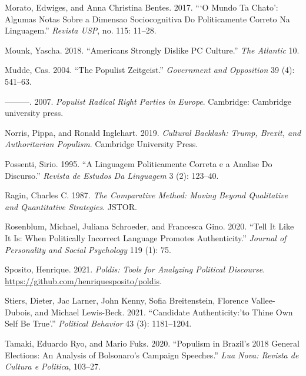 \documentclass[
  12pt,
]{article}
\newlength{\cslhangindent}
\newlength{\cslentryspacingunit} %
\newenvironment{CSLReferences}[2] %
 {%
  \setlength{\parindent}{0pt}
  \ifodd #1
  \let\oldpar\par
  \def\par{\hangindent=\cslhangindent\oldpar}
  \fi
  \setlength{\parskip}{#2\cslentryspacingunit}
 }%
 {}
\begin{document}
\begin{CSLReferences}{1}{0}
\leavevmode{}%
Morato, Edwiges, and Anna Christina Bentes. 2017. {``{`O Mundo Ta
Chato'}: Algumas Notas Sobre a Dimensao Sociocognitiva Do Politicamente
Correto Na Linguagem.''} \emph{Revista USP}, no. 115: 11--28.

\leavevmode{}%
Mounk, Yascha. 2018. {``Americans Strongly Dislike PC Culture.''}
\emph{The Atlantic} 10.

\leavevmode{}%
Mudde, Cas. 2004. {``The Populist Zeitgeist.''} \emph{Government and
Opposition} 39 (4): 541--63.

\leavevmode{}%
---------. 2007. \emph{Populist Radical Right Parties in Europe}.
Cambridge: Cambridge university press.

\leavevmode{}%
Norris, Pippa, and Ronald Inglehart. 2019. \emph{Cultural Backlash:
Trump, Brexit, and Authoritarian Populism}. Cambridge University Press.

\leavevmode{}%
Possenti, Sirio. 1995. {``A Linguagem Politicamente Correta e a Analise
Do Discurso.''} \emph{Revista de Estudos Da Linguagem} 3 (2): 123--40.

\leavevmode{}%
Ragin, Charles C. 1987. \emph{The Comparative Method: Moving Beyond
Qualitative and Quantitative Strategies}. JSTOR.

\leavevmode{}%
Rosenblum, Michael, Juliana Schroeder, and Francesca Gino. 2020. {``Tell
It Like It Is: When Politically Incorrect Language Promotes
Authenticity.''} \emph{Journal of Personality and Social Psychology} 119
(1): 75.

\leavevmode{}%
Sposito, Henrique. 2021. \emph{Poldis: Tools for Analyzing Political
Discourse}. \url{https://github.com/henriquesposito/poldis}.

\leavevmode{}%
Stiers, Dieter, Jac Larner, John Kenny, Sofia Breitenstein, Florence
Vallee-Dubois, and Michael Lewis-Beck. 2021. {``Candidate
Authenticity:'to Thine Own Self Be True'.''} \emph{Political Behavior}
43 (3): 1181--1204.

\leavevmode{}%
Tamaki, Eduardo Ryo, and Mario Fuks. 2020. {``Populism in Brazil's 2018
General Elections: An Analysis of Bolsonaro's Campaign Speeches.''}
\emph{Lua Nova: Revista de Cultura e Politica}, 103--27.


\end{CSLReferences}
\end{document}
